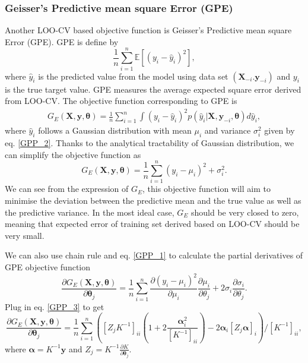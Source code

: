 \documentclass[11pt,a4paper]{article}
\theoremstyle{definition}
\numberwithin{equation}{section}
\let\vec\mathbf
\begin{document}
	\subsubsection*{Geisser's Predictive mean square Error (GPE)}
	Another LOO-CV based objective function is Geisser's Predictive mean square Error (GPE)\cite[Geisser and Eddy]{Geisser_Eddy}\cite[Sundararajan and Keerthi]{Sundararajan_Keerthi}. GPE is define by
	\begin{equation}
	\frac{1}{n}\sum_{i=1}^{n}\mathbb E[(y_i-\hat{y}_i)^2], 
	\end{equation}
	where $\hat{y}_i$ is the predicted value from the model using data set $(\vec X_{-i}.\vec y_{-i})$ and $y_i$ is the true target value. GPE measures the average expected square error derived from LOO-CV. The objective function corresponding to GPE is
	\begin{equation}\label{GPE}
	\begin{split}
	G_E(\vec X,\vec y, \vec \theta) = \frac{1}{n}\sum_{i=1}^{n}\int (y_i-\hat{y}_i)^2 p(\hat y_i|\vec X,\vec y_{-i},\vec \theta)d\hat y_i,
	\end{split}
	\end{equation}
	where $\hat y_i$ follows a Gaussian distribution with mean $\mu_i$ and variance $\sigma^2_i$ given by eq. \ref{GPP_2}. Thanks to the analytical tractability of Gaussian distribution, we can simplify the objective function as 
	\begin{equation}\label{GPE_1}
	G_E(\vec X,\vec y, \vec \theta) = \frac{1}{n}\sum_{i=1}^{n}(y_i-\mu_i)^2+\sigma^2_i.
	\end{equation}
	We can see from the expression of $G_E$, this objective function will aim to minimise the deviation between the predictive mean and the true value as well as the predictive variance. In the most ideal case, $G_E$ should be very closed to zero, meaning that expected error of training set derived based on LOO-CV should be very small. 
	
	We can also use chain rule and eq. \ref{GPP_1} to calculate the partial derivatives of GPE objective function
	\begin{equation}\label{GPE_derivative}
	\frac{\partial G_E(\vec X,\vec y, \vec \theta)}{\partial \vec \theta_j} = \frac{1}{n}\sum_{i=1}^{n}\frac{\partial (y_i-\mu_i)^2}{\partial \mu_i}\frac{\partial \mu_i}{\partial \theta_j}+2\sigma_i\frac{\partial \sigma_i}{\partial \theta_j}.
	\end{equation}
	Plug in eq. \ref{GPP_3} to get
	\begin{equation}\label{GPE_derivative_2}
	\frac{\partial G_E(\vec X,\vec y, \vec \theta)}{\partial \vec \theta_j} = \frac{1}{n}\sum_{i=1}^{n}\left([Z_j K^{-1}]_{ii}\left(1+2\frac{\vec\alpha^2_i}{[K^{-1}]_{ii}}\right)-2\vec \alpha_i[Z_j\vec\alpha]_i\right)/[K^{-1}]_{ii},
	\end{equation}
	where $\vec \alpha = K^{-1}\vec y$ and $Z_j = K^{-1}\frac{\partial K}{\partial \vec \theta_j}$.
	
\end{document}
